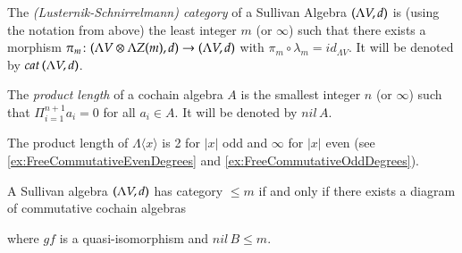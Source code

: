 \begin{Definition}
\label{def:LSCategory}
 The \emph{(Lusternik-Schnirrelmann) category} of a Sullivan Algebra $(\Lambda V,d)$ is (using the notation from above) the 
 least integer $m$ (or $\infty$) such that there exists a morphism 
 $\pi_m \colon (\Lambda V \otimes \Lambda Z(m) , d) \to (\Lambda V,d)$ with $\pi_m \circ \lambda_m = id_{\Lambda V}$.
 It will be denoted by $cat \, (\Lambda V,d)$.
\end{Definition}

\begin{Definition}
 The \emph{product length} of a cochain algebra $A$ is the smallest integer $n$ (or $\infty$) such that 
 $\Pi_{i = 1}^{n+1} a_i = 0$  for all $a_i \in A$. It will be denoted by $nil \,A$.
\end{Definition}

\begin{Example}
 The product length of $\Lambda \langle x \rangle$ is 2 for $|x|$ odd and $\infty$ for $|x|$ even
 (see \ref{ex:FreeCommutativeEvenDegrees} and \ref{ex:FreeCommutativeOddDegrees}).
\end{Example}

\begin{Proposition}
  A Sullivan algebra $(\Lambda V,d)$ has category $ \leq m$ if and only if there exists a diagram of commutative cochain
  algebras 
  
  \centerline{
  }
  
  where $gf$ is a quasi-isomorphism and $nil \,B \leq m$.
\end{Proposition}

